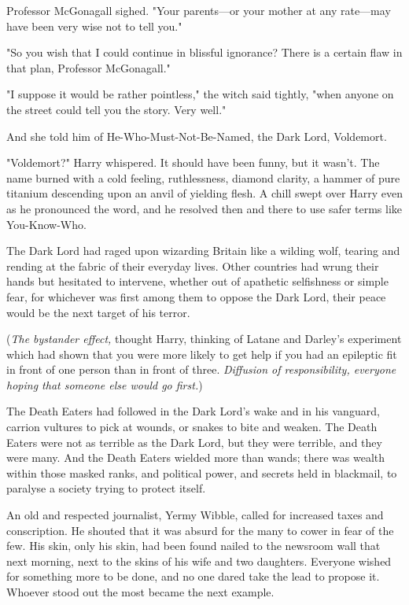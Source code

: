 Professor McGonagall sighed. "Your parents---or your mother at any rate---may 
have been very wise not to tell you."

"So you wish that I could continue in blissful ignorance? There is a certain 
flaw in that plan, Professor McGonagall."

"I suppose it would be rather pointless," the witch said tightly, "when anyone 
on the street could tell you the story. Very well."

And she told him of He-Who-Must-Not-Be-Named, the Dark Lord, Voldemort.

"Voldemort?" Harry whispered. It should have been funny, but it wasn't. The 
name burned with a cold feeling, ruthlessness, diamond clarity, a hammer of 
pure titanium descending upon an anvil of yielding flesh. A chill swept over 
Harry even as he pronounced the word, and he resolved then and there to use 
safer terms like You-Know-Who.

The Dark Lord had raged upon wizarding Britain like a wilding wolf, tearing and 
rending at the fabric of their everyday lives. Other countries had wrung their 
hands but hesitated to intervene, whether out of apathetic selfishness or 
simple fear, for whichever was first among them to oppose the Dark Lord, their 
peace would be the next target of his terror.

(\emph{The bystander effect,} thought Harry, thinking of Latane and Darley's 
experiment which had shown that you were more likely to get help if you had an 
epileptic fit in front of one person than in front of three. \emph{Diffusion of 
responsibility, everyone hoping that someone else would go first.})

The Death Eaters had followed in the Dark Lord's wake and in his vanguard, 
carrion vultures to pick at wounds, or snakes to bite and weaken. The Death 
Eaters were not as terrible as the Dark Lord, but they were terrible, and they 
were many. And the Death Eaters wielded more than wands; there was wealth 
within those masked ranks, and political power, and secrets held in blackmail, 
to paralyse a society trying to protect itself.

An old and respected journalist, Yermy Wibble, called for increased taxes and 
conscription. He shouted that it was absurd for the many to cower in fear of 
the few. His skin, only his skin, had been found nailed to the newsroom wall 
that next morning, next to the skins of his wife and two daughters. Everyone 
wished for something more to be done, and no one dared take the lead to propose 
it. Whoever stood out the most became the next example.


